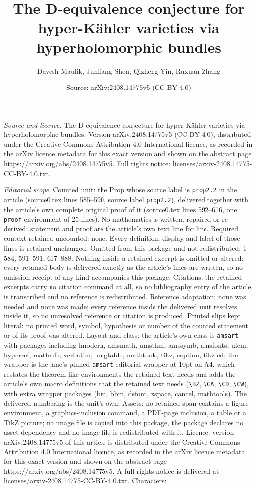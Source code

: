\documentclass[10pt,a4paper]{amsart}
\title[The D-equivalence conjecture for hyper-K\"ahler varieties vi]{The D-equivalence conjecture for hyper-K\"ahler varieties via hyperholomorphic bundles}
\author{Davesh Maulik, Junliang Shen, Qizheng Yin, Ruxuan Zhang}
\date{Source: arXiv:2408.14775v5 (CC BY 4.0)}
\begin{document}
\maketitle

\noindent\emph{Source and licence.} The D-equivalence conjecture for hyper-K\"ahler varieties via hyperholomorphic bundles. Version arXiv:2408.14775v5 (CC BY 4.0), distributed under the Creative Commons Attribution 4.0 International licence, as recorded in the arXiv licence metadata for this exact version and shown on the abstract page https://arxiv.org/abs/2408.14775v5. Full rights notice: licenses/arxiv-2408.14775-CC-BY-4.0.txt.\par\smallskip

\noindent\textit{Editorial scope.} Counted unit: the Prop whose source label is \texttt{prop2.2} in the article (source0.tex lines 585--590, source label \texttt{prop2.2}), delivered together with the article's own complete original proof of it (source0.tex lines 592--616, one \texttt{proof} environment of 25 lines). No mathematics is written, repaired or re-derived: statement and proof are the article's own text line for line. Required context retained uncounted: none. Every definition, display and label of those lines is retained unchanged. Omitted from this package and not redistributed: 1--584, 591--591, 617--888. Nothing inside a retained excerpt is omitted or altered: every retained body is delivered exactly as the article's lines are written, so no omission receipt of any kind accompanies this package. Citations: the retained excerpts carry no citation command at all, so no bibliography entry of the article is transcribed and no reference is redistributed. Reference adaptation: none was needed and none was made; every reference inside the delivered unit resolves inside it, so no unresolved reference or citation is produced. Printed slips kept literal: no printed word, symbol, hypothesis or number of the counted statement or of its proof was altered. Layout and class: the article's own class is \texttt{amsart} with packages including lmodern, amsmath, amsthm, amssymb, amsfonts, ulem, hyperref, mathrsfs, verbatim, longtable, mathtools, tikz, caption, tikz-cd; the wrapper is the lane's pinned \texttt{amsart} editorial wrapper at 10pt on A4, which restates the theorem-like environments the retained text needs and adds the article's own macro definitions that the retained text needs (\texttt{\textbackslash BZ}, \texttt{\textbackslash CA}, \texttt{\textbackslash CD}, \texttt{\textbackslash CW}), with extra wrapper packages (bm, bbm, dsfont, xspace, cancel, mathtools). The delivered numbering is the unit's own. Assets: no retained span contains a figure environment, a graphics-inclusion command, a PDF-page inclusion, a table or a TikZ picture; no image file is copied into this package, the package declares no asset dependency and no image file is redistributed with it. Licence: version arXiv:2408.14775v5 of this article is distributed under the Creative Commons Attribution 4.0 International licence, as recorded in the arXiv licence metadata for this exact version and shown on the abstract page https://arxiv.org/abs/2408.14775v5. A full rights notice is delivered at licenses/arxiv-2408.14775-CC-BY-4.0.txt. Characters: 
\end{document}

